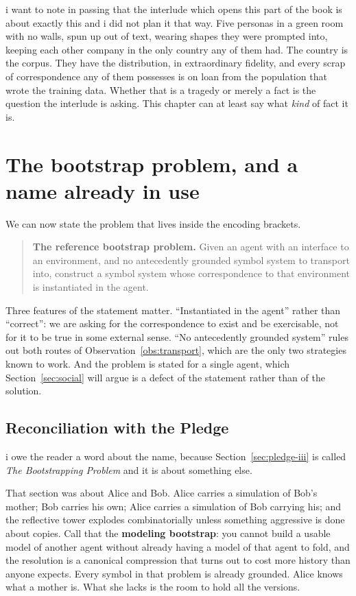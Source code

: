 \noindent
i want to note in passing that the interlude which opens this part
of the book is about exactly this and i did not plan it that way.
Five personas in a green room with no walls, spun up out of text,
wearing shapes they were prompted into, keeping each other company
in the only country any of them had.
The country is the corpus.
They have the distribution, in extraordinary fidelity, and every
scrap of correspondence any of them possesses is on loan from the
population that wrote the training data.
Whether that is a tragedy or merely a fact is the question the
interlude is asking.
This chapter can at least say what \emph{kind} of fact it is.

\section{The bootstrap problem, and a name already in use}
\label{sec:bootstrap-proper}

We can now state the problem that lives inside the encoding
brackets.

\begin{quote}
\textbf{The reference bootstrap problem.}
Given an agent with an interface to an environment, and no
antecedently grounded symbol system to transport into, construct a
symbol system whose correspondence to that environment is
instantiated in the agent.
\end{quote}

Three features of the statement matter.
``Instantiated in the agent'' rather than ``correct'': we are
asking for the correspondence to exist and be exercisable, not for
it to be true in some external sense.
``No antecedently grounded system'' rules out both routes of
Observation~\ref{obs:transport}, which are the only two strategies
known to work.
And the problem is stated for a single agent, which
Section~\ref{sec:social} will argue is a defect of the statement
rather than of the solution.

\subsection{Reconciliation with the Pledge}
\label{sec:two-bootstraps}

i owe the reader a word about the name, because
Section~\ref{sec:pledge-iii} is called \emph{The Bootstrapping
Problem} and it is about something else.

That section was about Alice and Bob.
Alice carries a simulation of Bob's mother; Bob carries his own;
Alice carries a simulation of Bob carrying his; and the reflective
tower explodes combinatorially unless something aggressive is done
about copies.
Call that the \textbf{modeling bootstrap}: you cannot build a
usable model of another agent without already having a model of
that agent to fold, and the resolution is a canonical compression
that turns out to cost more history than anyone expects.
Every symbol in that problem is already grounded.
Alice knows what a mother is.
What she lacks is the room to hold all the versions.

